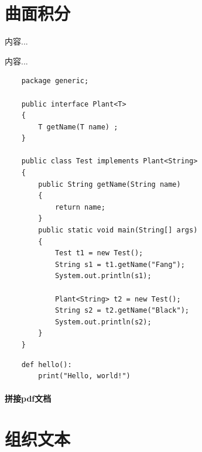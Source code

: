 \section{曲面积分}
\setcounter{example}{0}
\begin{example}
	内容...
\end{example}
\begin{remark}
	内容...
\end{remark}
\begin{formal}
\lipsum[7]
\end{formal}
\setlength\FrameSep{0.2em}
\begin{framed}

\begin{lstlisting}
	package generic;
	
	public interface Plant<T> 
	{
		T getName(T name) ;
	}
	
	public class Test implements Plant<String>
	{
		public String getName(String name)
		{
			return name;
		}
		public static void main(String[] args)
		{
			Test t1 = new Test();
			String s1 = t1.getName("Fang");
			System.out.println(s1);
			
			Plant<String> t2 = new Test();
			String s2 = t2.getName("Black");
			System.out.println(s2);
		}
	}
\end{lstlisting}


\end{framed}
\begin{verbatim}
    def hello():
        print("Hello, world!")
\end{verbatim}

\paragraph{拼接pdf文档}

	


\newpage 
\section{组织文本}
